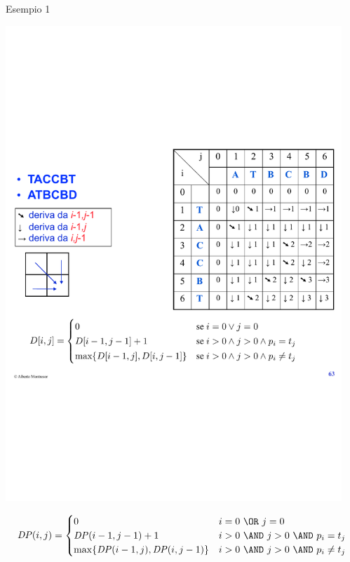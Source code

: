 \begin{frame}{Esempio 1}

\centering
\vspace{-12pt}
\includegraphics[width=0.95\textwidth,page=1]{lcs.pdf}

\tiny
\[
  \mathit{DP}(i,j) = \begin{cases}
   0 & i=0\ \OR\ j=0 \\
   \mathit{DP}(i-1,j-1)+1 & i>0\ \AND\ j>0\ \AND\ p_i = t_j \\
   \max \{ \mathit{DP}(i-1,j), \mathit{DP}(i,j-1) \} & i>0\ \AND\ j>0\ \AND\ p_i \neq t_j
  \end{cases}
\]

\end{frame}

